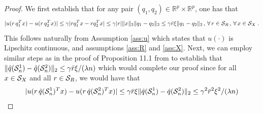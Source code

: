 \documentclass[]{interact}
\theoremstyle{plain}%
\theoremstyle{definition}
\theoremstyle{remark}
\newcommand{\0}{\V{0}}
\newcommand{\1}{\V{1}}
\renewcommand{\Re}{\mathbb{R}}
\theoremstyle{plain}
\theoremstyle{definition}
\begin{document}
\begin{proof}
We first establish that for any
  pair $(q_1,q_2)\in\Re^p\times\Re^p$, one has that
  \[ 
    |u(r\,q_1^T x) - u(r\,q_2^T x)| \leq \gamma |rq_1^Tx - rq_2^Tx|\leq \gamma|r|\|x\|_2\|q_1- q_2\|_2 \leq \gamma\bar{r} \xi \|q_1- q_2\|_2\,,\,\forall\,r\in{\mathcal{S}_R}\,,\,\forall\,x\in{\mathcal{S}_X}\;.
  \]
  This follows naturally from Assumption \ref{ass:u} which states that $u(\cdot)$ is Lipschitz continuous, and assumptions \ref{ass:R} and \ref{ass:X}. Next, we can employ similar steps as in the proof of Proposition 11.1 from \cite{mohri2012foundations} to establish that $\|{\hat{q}}(\mathcal{S}_n^1)-{\hat{q}}(\mathcal{S}_n^2)\|_2 \leq \gamma \bar{r} \xi/(\lambda n)$ which would complete our proof since for all $x\in{\mathcal{S}_X}$ and all $r\in{\mathcal{S}_R}$, we would have that
  \[ |u(r\,{\hat{q}}(\mathcal{S}_n^1)^T x) - u(r\,{\hat{q}}(\mathcal{S}_n^2)^T x)| \leq \gamma\bar{r} \xi \|{\hat{q}}(\mathcal{S}_n^1)- {\hat{q}}(\mathcal{S}_n^2)\|_2 \leq \gamma^2 \bar{r}^2\xi^2 /(\lambda n)\]
  

\end{proof}
\end{document}
